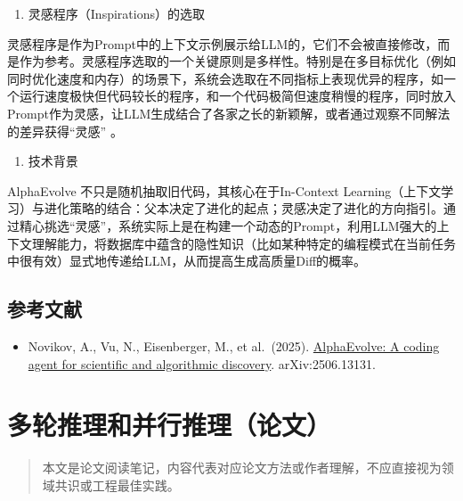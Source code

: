 \begin{enumerate}
\def\labelenumi{\arabic{enumi}.}
\setcounter{enumi}{1}
\tightlist
\item
  灵感程序（Inspirations）的选取
\end{enumerate}

灵感程序是作为Prompt中的上下文示例展示给LLM的，它们不会被直接修改，而是作为参考。灵感程序选取的一个关键原则是多样性。特别是在多目标优化（例如同时优化速度和内存）的场景下，系统会选取在不同指标上表现优异的程序，如一个运行速度极快但代码较长的程序，和一个代码极简但速度稍慢的程序，同时放入Prompt作为灵感，让LLM生成结合了各家之长的新颖解，或者通过观察不同解法的差异获得``灵感'' 。

\begin{enumerate}
\def\labelenumi{\arabic{enumi}.}
\setcounter{enumi}{2}
\tightlist
\item
  技术背景
\end{enumerate}

AlphaEvolve 不只是随机抽取旧代码，其核心在于In-Context Learning（上下文学习）与进化策略的结合：父本决定了进化的起点；灵感决定了进化的方向指引。通过精心挑选``灵感''，系统实际上是在构建一个动态的Prompt，利用LLM强大的上下文理解能力，将数据库中蕴含的隐性知识（比如某种特定的编程模式在当前任务中很有效）显式地传递给LLM，从而提高生成高质量Diff的概率。

\hypertarget{ux53c2ux8003ux6587ux732e-125}{%
\subsection{参考文献}\label{ux53c2ux8003ux6587ux732e-125}}

\begin{itemize}
\tightlist
\item
  Novikov, A., Vu, N., Eisenberger, M., et al.~(2025). \href{https://arxiv.org/abs/2506.13131}{AlphaEvolve: A coding agent for scientific and algorithmic discovery}. arXiv:2506.13131.
\end{itemize}

\clearpage

\hypertarget{ux591aux8f6eux63a8ux7406ux548cux5e76ux884cux63a8ux7406ux8bbaux6587}{%
\section{多轮推理和并行推理（论文）}\label{ux591aux8f6eux63a8ux7406ux548cux5e76ux884cux63a8ux7406ux8bbaux6587}}

\begin{quote}
本文是论文阅读笔记，内容代表对应论文方法或作者理解，不应直接视为领域共识或工程最佳实践。
\end{quote}

